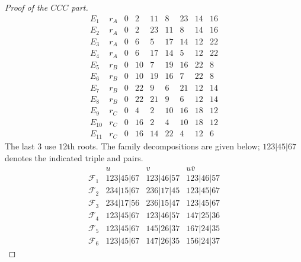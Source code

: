 \documentclass[11pt,a4paper]{article}
\theoremstyle{plain}
\theoremstyle{definition}
\numberwithin{equation}{section}
\begin{document}
\begin{proof}[Proof of the $CCC$ part]
$$\begin{array}{c|c|rrrrrrr}
E_1&r_A&0&2&11&8&23&14&16\\
E_2&r_A&0&2&23&11&8&14&16\\
E_3&r_A&0&6&5&17&14&12&22\\
E_4&r_A&0&6&17&14&5&12&22\\
E_5&r_B&0&10&7&19&16&22&8\\
E_6&r_B&0&10&19&16&7&22&8\\
E_7&r_B&0&22&9&6&21&12&14\\
E_8&r_B&0&22&21&9&6&12&14\\
E_9&r_C&0&4&2&10&16&18&12\\
E_{10}&r_C&0&16&2&4&10&18&12\\
E_{11}&r_C&0&16&14&22&4&12&6
\end{array}
$$
The last $3$ use $12$th roots. The family decompositions are given below; $123|45|67$ denotes the indicated triple and pairs.
$$
\begin{array}{c|c|c|c}
 &u&v&u\bar{v}\\ \hline
\mathcal F_1&123|45|67&123|46|57&123|46|57\\
\mathcal F_2&234|15|67&236|17|45&123|45|67\\
\mathcal F_3&234|17|56&236|15|47&123|45|67\\
\mathcal F_4&123|45|67&123|46|57&147|25|36\\
\mathcal F_5&123|45|67&145|26|37&167|24|35\\
\mathcal F_6&123|45|67&147|26|35&156|24|37
\end{array}
$$


\end{proof}
\end{document}
